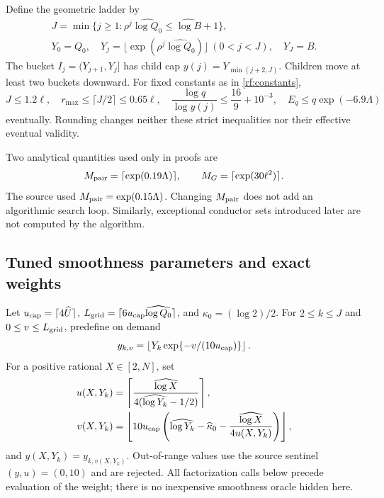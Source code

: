 Define the geometric ladder by
\begin{gather*}
 J=\min\{j\ge1:\rho^j\widehat{\log Q_0}
                       \le\widehat{\log B}+1\},\\
 Y_0=Q_0,\quad
 Y_j=\lfloor\exp(\rho^j\widehat{\log Q_0})\rfloor\ (0<j<J),
 \quad Y_J=B.
\end{gather*}
The bucket $I_j=(Y_{j+1},Y_j]$ has child cap
$y(j)=Y_{\min(j+2,J)}$.  Children move at least two buckets downward.
For fixed constants as in \eqref{rf:constants},
\begin{equation}
 J\le1.2\ell,\quad
 r_{\max}\le\lceil J/2\rceil\le0.65\ell,\quad
 \frac{\log q}{\log y(j)}\le\frac{16}{9}+10^{-3},\quad
 E_q\le q\exp(-6.9\Lambda)
 \label{rf:ladderbounds}
\end{equation}
eventually.  Rounding changes neither these strict inequalities nor
their effective eventual validity.

Two analytical quantities used only in proofs are
\begin{equation}
 M_{\rm pair}=\lceil\exp(0.19\Lambda)\rceil,
 \qquad M_G=\lceil\exp(30\ell^2)\rceil.
 \label{rf:analyticaux}
\end{equation}
The source used $M_{\rm pair}=\exp(0.15\Lambda)$.
Changing $M_{\rm pair}$ does not add an algorithmic search loop.
Similarly, exceptional conductor sets introduced later are not
computed by the algorithm.

\subsection{Tuned smoothness parameters and exact weights}

Let $u_{\rm cap}=\lceil4\widehat U\rceil$,
$L_{\rm grid}=\lceil6u_{\rm cap}\widehat{\log Q_0}\rceil$, and
$\kappa_0=(\log2)/2$.  For $2\le k\le J$ and
$0\le v\le L_{\rm grid}$, predefine on demand
\[
 y_{k,v}=\left\lfloor
      Y_k\exp\{-v/(10u_{\rm cap})\}\right\rfloor.
\]
For a positive rational $X\in[2,N]$, set
\begin{align}
 u(X,Y_k)&=
 \left\lceil\frac{\widehat{\log X}}
                   {4(\widehat{\log Y_k}-1/2)}\right\rceil,
 \label{rf:tune-u}\\
 v(X,Y_k)&=
 \left\lfloor10u_{\rm cap}
 \left(\widehat{\log Y_k}-\widehat\kappa_0-
       \frac{\widehat{\log X}}{4u(X,Y_k)}\right)\right\rfloor,
 \label{rf:tune-y}
\end{align}
and $y(X,Y_k)=y_{k,v(X,Y_k)}$.
Out-of-range values use the source sentinel $(y,u)=(0,10)$ and are
rejected.  All factorization calls below precede evaluation of the
weight; there is no inexpensive smoothness oracle hidden here.

